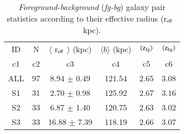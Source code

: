 \documentclass[longauth]{aa}
\begin{document}
\begin{appendix}
\begin{table}[h]
\centering
\caption{\label{tbl:PairsStat-REFF}
\textit{Foreground-background} (\textit{fg-bg}) galaxy pair statistics 
according to their effective radius (r$_{\rm{eff}}$ \, kpc).}
\begin{tabular}{cccccc}
  \\
  \hline\hline
  \multicolumn{1}{c}{ID} &
  \multicolumn{1}{c}{N} &
  \multicolumn{1}{c}{$\langle$ r$_{\rm{eff}}$ $\rangle$ (kpc) }&
  \multicolumn{1}{c}{$\langle b \rangle$ (kpc)} & 
  \multicolumn{1}{c}{$\langle \rm{z}_{\rm{fg}}\rangle$} &
  \multicolumn{1}{c}{$\langle \rm{z}_{\rm{bg}}\rangle$} \\
  \multicolumn{1}{c}{c1} & 
  \multicolumn{1}{c}{c2} &
  \multicolumn{1}{c}{c3} &
  \multicolumn{1}{c}{c4} &
  \multicolumn{1}{c}{c5} &
  \multicolumn{1}{c}{c6} \\
  \hline\hline  
ALL &  97 &  8.94 $\pm$ 0.49 & 121.54 & 2.65 & 3.08 \\
S1  &  31 &  2.70 $\pm$ 0.98 & 125.92 & 2.67 & 3.16 \\
S2  &  33 &  6.87 $\pm$ 1.40 & 120.75 & 2.63 & 3.02 \\
S3  &  33 & 16.88 $\pm$ 7.39 & 118.19 & 2.66 & 3.07 \\
  \hline\hline
\end{tabular}
\end{table}

\end{appendix}
\end{document}
